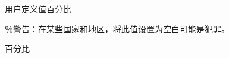 用户定义值百分比

\newcommand{\textHospitalName}{萧山区中医院}
\newcommand{\textPatientName}{纪翠霞}
\newcommand{\textPatientGender}{女性}
\newcommand{\textPatientAge}{68 岁}
\newcommand{\textPatientDep}{内分泌科}
\newcommand{\textPatientID}{114692}
\newcommand{\textPatientFeeType}{普通病人}
\newcommand{\textPatientDateYear}{\the\year}
\newcommand{\textPatientDateMonth}{\the\month}
\newcommand{\textPatientDateDay}{\the\day}
\newcommand{\textPatientDiag}{雌激素不足}
\newcommand{\textDoctorName}{赵紫羊}
\newcommand{\textFee}{28.40 元}

％警告：在某些国家和地区，将此值设置为空白可能是犯罪。
\newcommand{\textWatermark}{}

百分比

\newcommand{\styleNormalText}{\songti \fontsize{15}{15} \selectfont }
\newcommand{\blockUnderlinedText}[1]
    {\uline{\space\space #1 \space\space}}
\newcommand{\blockRSign}
    {{\bfseries \sffamily \fontsize{40}{40}\selectfont \; R.}}
\newcommand{\blockMedicine}[3]{
    {
\大#1
        \hfill
\大#2
        \hfill
    }
    \\
    \hspace*{1cm}
    {
\大号用法：#3
    }
}
